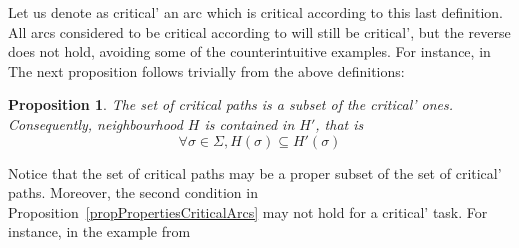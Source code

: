 \documentclass[letterpaper]{article}
\newtheorem{proposition}{Proposition}
\begin{document}
Let us denote as critical' an arc which is critical according to this last definition. All arcs considered to be critical according to \cite{Fortemps1997} will still be critical', but the reverse does not hold, avoiding some of the counterintuitive examples. For instance, in %
The next proposition follows trivially from the above definitions:
\begin{proposition}\label{propComparisonCorH2InH1}
The set of critical paths is a subset of the critical' ones. Consequently, neighbourhood $H$ is contained in $H'$, that is
\begin{equation}
\forall \sigma \in \Sigma, H(\sigma) \subseteq H'(\sigma)
\end{equation}
\end{proposition}
Notice that the set of critical paths may be a proper subset of the set of critical' paths. Moreover, the second condition in Proposition~\ref{propPropertiesCriticalArcs} may not hold for a critical' task. For instance, in the example from %
\end{document}

